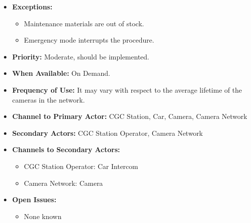 \documentclass[12pt]{article}
\begin{document}
\begin{itemize}
        \item[]\textbf{Exceptions:}
            \begin{itemize}
                \item[] Maintenance materials are out of stock.
                \item[] Emergency mode interrupts the procedure.
            \end{itemize}

        \item[]\textbf{Priority:}
            Moderate, should be implemented.

        \item[]\textbf{When Available:}
            On Demand.

        \item[]\textbf{Frequency of Use:}
            It may vary with respect to the average lifetime of the cameras in the network.

        \item[]\textbf{Channel to Primary Actor:}
            CGC Station, Car, Camera, Camera Network

        \item[]\textbf{Secondary Actors:}
            CGC Station Operator, Camera Network
            
        \item[]\textbf{Channels to Secondary Actors:}
            \begin{itemize}
                \item[] CGC Station Operator: Car Intercom
                \item[] Camera Network: Camera
            \end{itemize}

        \item[]\textbf{Open Issues:}
            \begin{itemize}
                \item[] None known
            \end{itemize}
    \end{itemize}
%    
%    
%    
    
\end{document}
